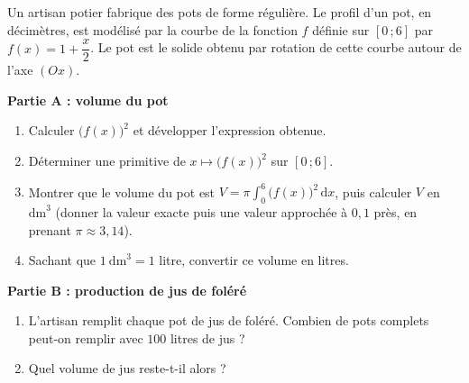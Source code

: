 \documentclass[11pt]{article}
\begin{document}
\begin{exercice}
Un artisan potier fabrique des pots de forme régulière. Le profil d'un pot, en décimètres, est modélisé par la courbe de la fonction $f$ définie sur $[0\,;6]$ par $f(x)=1+\dfrac{x}{2}$. Le pot est le solide obtenu par rotation de cette courbe autour de l'axe $(Ox)$.

\textbf{Partie A : volume du pot}
\begin{enumerate}
\item Calculer $\big(f(x)\big)^2$ et développer l'expression obtenue.
\item Déterminer une primitive de $x\mapsto \big(f(x)\big)^2$ sur $[0\,;6]$.
\item Montrer que le volume du pot est $\displaystyle V=\pi\int_0^6 \big(f(x)\big)^2\,\mathrm{d}x$, puis calculer $V$ en $\mathrm{dm}^3$ (donner la valeur exacte puis une valeur approchée à $0{,}1$ près, en prenant $\pi\approx 3{,}14$).
\item Sachant que $1\ \mathrm{dm}^3 = 1$ litre, convertir ce volume en litres.
\end{enumerate}

\textbf{Partie B : production de jus de foléré}
\begin{enumerate}
\item L'artisan remplit chaque pot de jus de foléré. Combien de pots complets peut-on remplir avec $100$ litres de jus ?
\item Quel volume de jus reste-t-il alors ?
\end{enumerate}
\end{exercice}
\end{document}
